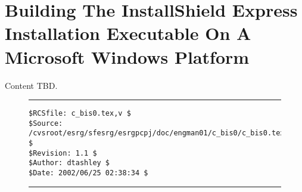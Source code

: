 %
\chapter{Building The InstallShield Express Installation Executable On
         A Microsoft Windows Platform}
\label{cbis0}

Content TBD.


\noindent\begin{figure}[!b]
\noindent\rule[-0.25in]{\textwidth}{1pt}
\begin{tiny}
\begin{verbatim}
$RCSfile: c_bis0.tex,v $
$Source: /cvsroot/esrg/sfesrg/esrgpcpj/doc/engman01/c_bis0/c_bis0.tex,v $
$Revision: 1.1 $
$Author: dtashley $
$Date: 2002/06/25 02:38:34 $
\end{verbatim}
\end{tiny}
\noindent\rule[0.25in]{\textwidth}{1pt}
\end{figure}
%
